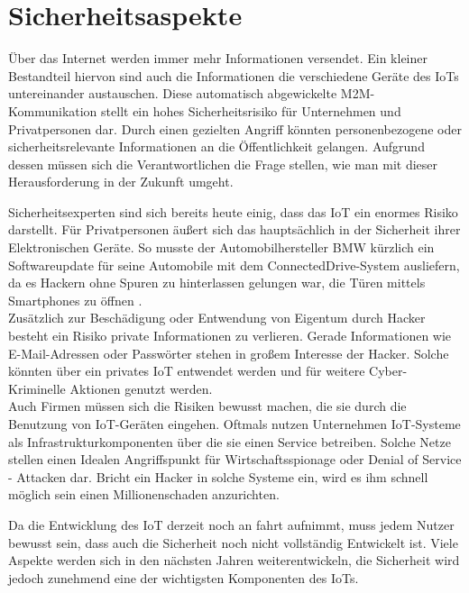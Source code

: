 \section{Sicherheitsaspekte}\label{s:Sicherheitsaspekte}

Über das Internet werden  immer mehr Informationen versendet. Ein kleiner Bestandteil hiervon sind auch die Informationen die verschiedene Geräte des \ac{IoT}s untereinander austauschen.
Diese automatisch abgewickelte \ac{M2M}-Kommunikation stellt ein hohes Sicherheitsrisiko für Unternehmen und Privatpersonen dar. Durch einen gezielten Angriff könnten personenbezogene oder sicherheitsrelevante Informationen an die Öffentlichkeit gelangen. Aufgrund dessen müssen sich die Verantwortlichen die Frage stellen, wie man mit dieser Herausforderung in der Zukunft umgeht. 

Sicherheitsexperten sind sich bereits heute einig, dass das \ac{IoT} ein enormes Risiko darstellt\cite{ws:iotsec}. Für Privatpersonen äußert sich das hauptsächlich in der Sicherheit ihrer Elektronischen Geräte. So musste der Automobilhersteller BMW kürzlich ein Softwareupdate für seine Automobile mit dem ConnectedDrive-System ausliefern, da es Hackern ohne Spuren zu hinterlassen gelungen war, die Türen mittels Smartphones zu öffnen \cite{ws:zeitbmw}.\\

Zusätzlich zur Beschädigung oder Entwendung von Eigentum durch Hacker besteht ein Risiko private Informationen zu verlieren. Gerade Informationen wie E-Mail-Adressen oder Passwörter stehen in großem Interesse der Hacker. Solche könnten über ein privates \ac{IoT} entwendet werden und für weitere Cyber-Kriminelle Aktionen genutzt werden. \\

Auch Firmen müssen sich die Risiken bewusst machen, die sie durch die Benutzung von \ac{IoT}-Geräten eingehen. Oftmals nutzen Unternehmen \ac{IoT}-Systeme als Infrastrukturkomponenten über die sie einen Service betreiben. Solche Netze stellen einen Idealen Angriffspunkt für Wirtschaftsspionage oder Denial of Service - Attacken dar. Bricht ein Hacker in solche Systeme ein, wird es ihm schnell möglich sein einen Millionenschaden anzurichten.


Da die Entwicklung des \ac{IoT} derzeit noch an fahrt aufnimmt, muss jedem Nutzer bewusst sein, dass auch die Sicherheit noch nicht vollständig Entwickelt ist. Viele Aspekte werden sich in den nächsten Jahren weiterentwickeln, die Sicherheit wird jedoch zunehmend eine der wichtigsten Komponenten des \ac{IoT}s.\\


